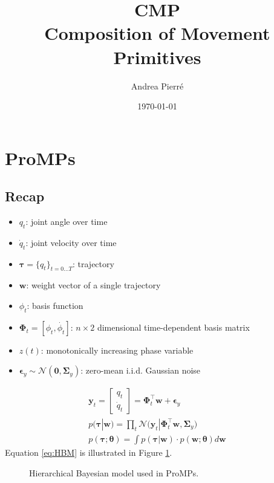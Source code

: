 \documentclass[11pt, letterpaper]{article}
\author{Andrea Pierré \\
}
\date{\today}
\title{CMP\\\medskip
\large Composition of Movement Primitives}
\begin{document}
\maketitle
\tableofcontents

\section{ProMPs}
\label{sec:org14f8ef7}
\subsection{Recap}
\label{sec:org9ff910b}
\begin{itemize}
\item \(q_t\): joint angle over time
\item \(\dot{q}_t\): joint velocity over time
\item \(\bm{\tau} = \{q_t\}_{t=0\dots T}\): trajectory
\item \(\bm{w}\): weight vector of a single trajectory
\item \(\phi_t\): basis function
\item \(\bm{\Phi}_t = [\phi_t, \dot{\phi_t}]\): \(n \times 2\) dimensional time-dependent basis matrix
\item \(z(t)\): monotonically increasing phase variable
\item \(\bm{\epsilon}_y \sim \mathcal{N}(\bm{0}, \bm{\Sigma}_y)\): zero-mean i.i.d. Gaussian noise
\end{itemize}

\begin{gather}
\bm{y}_t = \begin{bmatrix}
       q_t \\[0.3em]
       \dot{q}_t
     \end{bmatrix} = \bm{\Phi}^{\top}_{t}\bm{w} + \bm{\epsilon}_y\\
p(\bm{\tau}|\bm{w}) = \prod_t \mathcal{N}\Big(\bm{y}_t|\bm{\Phi}^{\top}_{t}\bm{w}, \bm{\Sigma}_y \Big)\\
p(\bm{\tau};\bm{\theta}) = \int p(\bm{\tau}|\bm{w}) \cdot p(\bm{w};\bm{\theta}) d\bm{w}\label{eq:HBM}
\end{gather}
Equation \ref{eq:HBM} is illustrated in Figure \ref{fig:HBM}.

\begin{figure}[htbp]
\centering
{}
\caption{Hierarchical Bayesian model used in ProMPs.}
\label{fig:HBM}
\end{figure}
\end{document}
